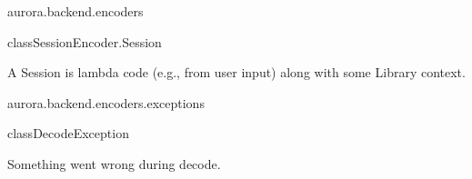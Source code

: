 \begin{texdocpackage}{aurora.backend.encoders}
\begin{texdocclass}{class}{SessionEncoder.Session}
\label{texdoclet:aurora.backend.encoders.SessionEncoder.Session}
\begin{texdocclassintro}
A Session is lambda code (e.g., from user input) along with some Library context.\end{texdocclassintro}
\begin{texdocclassfields}
\end{texdocclassfields}
\begin{texdocclassconstructors}
\end{texdocclassconstructors}
\end{texdocclass}


\end{texdocpackage}



\begin{texdocpackage}{aurora.backend.encoders.exceptions}
\label{texdoclet:aurora.backend.encoders.exceptions}

\begin{texdocclass}{class}{DecodeException}
\label{texdoclet:aurora.backend.encoders.exceptions.DecodeException}
\begin{texdocclassintro}
Something went wrong during decode.\end{texdocclassintro}
\begin{texdocclassconstructors}
\end{texdocclassconstructors}
\end{texdocclass}


\end{texdocpackage}



